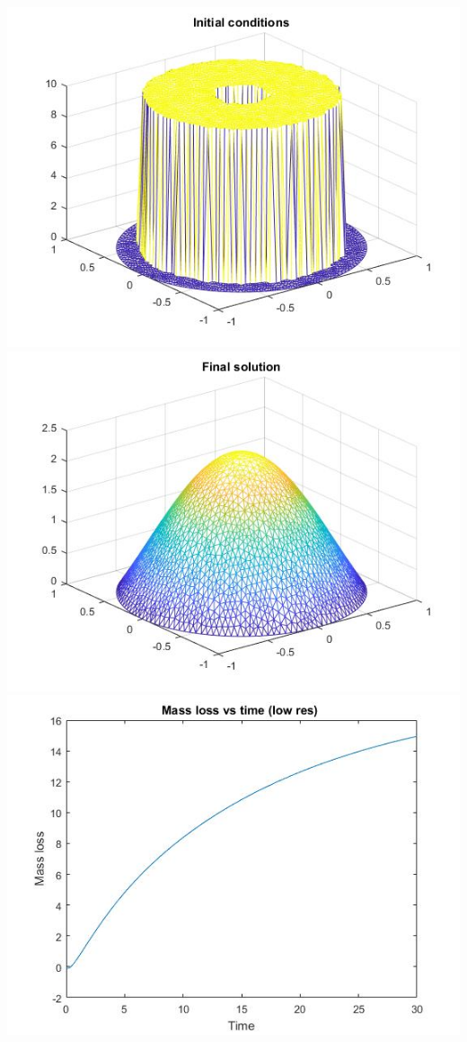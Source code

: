\documentclass[12pt]{article}
\begin{document}
	
	\normalsize
	\includegraphics[width=\textwidth]{p2_2_init}
	\includegraphics[width=\textwidth]{p2_2_final}
	\includegraphics[width=\textwidth]{p2_2_mllow}
\end{document}
